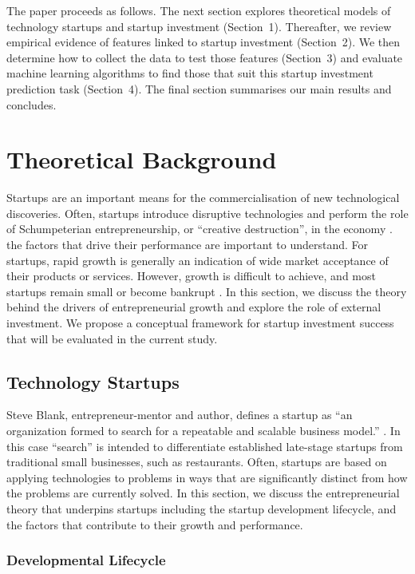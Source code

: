 \documentclass[../thesis/thesis.tex]{subfiles}
\begin{document}

The paper proceeds as follows. The next section explores theoretical models of technology startups and startup investment (Section~1). Thereafter, we review empirical evidence of features linked to startup investment (Section~2). We then determine how to collect the data to test those features (Section~3) and evaluate machine learning algorithms to find those that suit this startup investment prediction task (Section~4). The final section summarises our main results and concludes.

\section{Theoretical Background}
\label{sec:litreview:theory}

Startups are an important means for the commercialisation of new technological discoveries. Often, startups introduce disruptive technologies and perform the role of Schumpeterian entrepreneurship, or ``creative destruction'', in the economy \cite{timmons1986}. the factors that drive their performance are important to understand. For startups, rapid growth is generally an indication of wide market acceptance of their products or services. However, growth is difficult to achieve, and most startups remain small or become bankrupt \cite{hall2010}. In this section, we discuss the theory behind the drivers of entrepreneurial growth and explore the role of external investment. We propose a conceptual framework for startup investment success that will be evaluated in the current study.

\subsection{Technology Startups}

Steve Blank, entrepreneur-mentor and author, defines a startup as ``an organization formed to search for a repeatable and scalable business model.'' \cite{blank2010}. In this case ``search'' is intended to differentiate established late-stage startups from traditional small businesses, such as restaurants. Often, startups are based on applying technologies to problems in ways that are significantly distinct from how the problems are currently solved. In this section, we discuss the entrepreneurial theory that underpins startups including the startup development lifecycle, and the factors that contribute to their growth and performance.

\subsubsection{Developmental Lifecycle}
\end{document}
